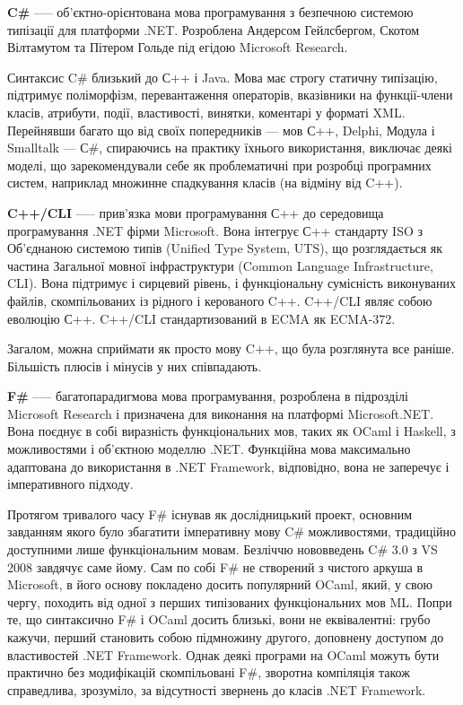 \textbf{C\#} --— об'єктно-орієнтована мова програмування з безпечною системою типізації для платформи .NET. Розроблена Андерсом Гейлсбергом, Скотом Вілтамутом та Пітером Гольде під егідою Microsoft Research.

Синтаксис C\# близький до С++ і Java. Мова має строгу статичну типізацію, підтримує поліморфізм, перевантаження операторів, вказівники на функції-члени класів, атрибути, події, властивості, винятки, коментарі у форматі XML. Перейнявши багато що від своїх попередників — мов С++, Delphi, Модула і Smalltalk — С\#, спираючись на практику їхнього використання, виключає деякі моделі, що зарекомендували себе як проблематичні при розробці програмних систем, наприклад множинне спадкування класів (на відміну від C++).

\textbf{C++/CLI} --— прив'язка мови програмування С++ до середовища програмування .NET фірми Microsoft. Вона інтегрує С++ стандарту ISO з Об'єднаною системою типів (Unified Type System, UTS), що розглядається як частина Загальної мовної інфраструктури (Common Language Infrastructure, CLI). Вона підтримує і сирцевий рівень, і функціональну сумісність виконуваних файлів, скомпільованих із рідного і керованого C++. C++/CLI являє собою еволюцію С++. C++/CLI стандартизований в ECMA як ECMA-372.

Загалом, можна сприймати як просто мову C++, що була розглянута все раніше. Більшість плюсів і мінусів у них співпадають.

\textbf{F\#} --— багатопарадигмова мова програмування, розроблена в підрозділі Microsoft Research і призначена для виконання на платформі Microsoft.NET. Вона поєднує в собі виразність функціональних мов, таких як OCaml і Haskell, з можливостями і об'єктною моделлю .NET. Функційна мова максимально адаптована до використання в .NET Framework, відповідно, вона не заперечує і імперативного підходу.

Протягом тривалого часу F\# існував як дослідницький проект, основним завданням якого було збагатити імперативну мову C\# можливостями, традиційно доступними лише функціональним мовам. Безліччю нововведень C\# 3.0 з VS 2008 завдячує саме йому. Сам по собі F\# не створений з чистого аркуша в Microsoft, в його основу покладено досить популярний OCaml, який, у свою чергу, походить від одної з перших типізованих функціональних мов ML. Попри те, що синтаксично F\# і OCaml досить близькі, вони не еквівалентні: грубо кажучи, перший становить собою підмножину другого, доповнену доступом до властивостей .NET Framework. Однак деякі програми на OCaml можуть бути практично без модифікацій скомпільовані F\#, зворотна компіляція також справедлива, зрозуміло, за відсутності звернень до класів .NET Framework.
